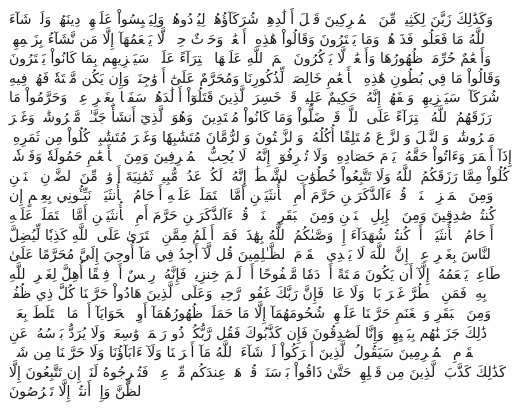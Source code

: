 وَكَذَٰلِكَ زَيَّنَ لِكَثِيرٖ مِّنَ ٱلۡمُشۡرِكِينَ قَتۡلَ أَوۡلَٰدِهِمۡ شُرَكَآؤُهُمۡ لِيُرۡدُوهُمۡ وَلِيَلۡبِسُواْ عَلَيۡهِمۡ دِينَهُمۡۖ وَلَوۡ شَآءَ ٱللَّهُ مَا فَعَلُوهُۖ فَذَرۡهُمۡ وَمَا يَفۡتَرُونَ
وَقَالُواْ هَٰذِهِۦٓ أَنۡعَٰمٞ وَحَرۡثٌ حِجۡرٞ لَّا يَطۡعَمُهَآ إِلَّا مَن نَّشَآءُ بِزَعۡمِهِمۡ وَأَنۡعَٰمٌ حُرِّمَتۡ ظُهُورُهَا وَأَنۡعَٰمٞ لَّا يَذۡكُرُونَ ٱسۡمَ ٱللَّهِ عَلَيۡهَا ٱفۡتِرَآءً عَلَيۡهِۚ سَيَجۡزِيهِم بِمَا كَانُواْ يَفۡتَرُونَ
وَقَالُواْ مَا فِي بُطُونِ هَٰذِهِ ٱلۡأَنۡعَٰمِ خَالِصَةٞ لِّذُكُورِنَا وَمُحَرَّمٌ عَلَىٰٓ أَزۡوَٰجِنَاۖ وَإِن يَكُن مَّيۡتَةٗ فَهُمۡ فِيهِ شُرَكَآءُۚ سَيَجۡزِيهِمۡ وَصۡفَهُمۡۚ إِنَّهُۥ حَكِيمٌ عَلِيمٞ
قَدۡ خَسِرَ ٱلَّذِينَ قَتَلُوٓاْ أَوۡلَٰدَهُمۡ سَفَهَۢا بِغَيۡرِ عِلۡمٖ وَحَرَّمُواْ مَا رَزَقَهُمُ ٱللَّهُ ٱفۡتِرَآءً عَلَى ٱللَّهِۚ قَدۡ ضَلُّواْ وَمَا كَانُواْ مُهۡتَدِينَ
۞وَهُوَ ٱلَّذِيٓ أَنشَأَ جَنَّـٰتٖ مَّعۡرُوشَٰتٖ وَغَيۡرَ مَعۡرُوشَٰتٖ وَٱلنَّخۡلَ وَٱلزَّرۡعَ مُخۡتَلِفًا أُكُلُهُۥ وَٱلزَّيۡتُونَ وَٱلرُّمَّانَ مُتَشَٰبِهٗا وَغَيۡرَ مُتَشَٰبِهٖۚ كُلُواْ مِن ثَمَرِهِۦٓ إِذَآ أَثۡمَرَ وَءَاتُواْ حَقَّهُۥ يَوۡمَ حَصَادِهِۦۖ وَلَا تُسۡرِفُوٓاْۚ إِنَّهُۥ لَا يُحِبُّ ٱلۡمُسۡرِفِينَ
وَمِنَ ٱلۡأَنۡعَٰمِ حَمُولَةٗ وَفَرۡشٗاۚ كُلُواْ مِمَّا رَزَقَكُمُ ٱللَّهُ وَلَا تَتَّبِعُواْ خُطُوَٰتِ ٱلشَّيۡطَٰنِۚ إِنَّهُۥ لَكُمۡ عَدُوّٞ مُّبِينٞ
ثَمَٰنِيَةَ أَزۡوَٰجٖۖ مِّنَ ٱلضَّأۡنِ ٱثۡنَيۡنِ وَمِنَ ٱلۡمَعۡزِ ٱثۡنَيۡنِۗ قُلۡ ءَآلذَّكَرَيۡنِ حَرَّمَ أَمِ ٱلۡأُنثَيَيۡنِ أَمَّا ٱشۡتَمَلَتۡ عَلَيۡهِ أَرۡحَامُ ٱلۡأُنثَيَيۡنِۖ نَبِّـُٔونِي بِعِلۡمٍ إِن كُنتُمۡ صَٰدِقِينَ
وَمِنَ ٱلۡإِبِلِ ٱثۡنَيۡنِ وَمِنَ ٱلۡبَقَرِ ٱثۡنَيۡنِۗ قُلۡ ءَآلذَّكَرَيۡنِ حَرَّمَ أَمِ ٱلۡأُنثَيَيۡنِ أَمَّا ٱشۡتَمَلَتۡ عَلَيۡهِ أَرۡحَامُ ٱلۡأُنثَيَيۡنِۖ أَمۡ كُنتُمۡ شُهَدَآءَ إِذۡ وَصَّىٰكُمُ ٱللَّهُ بِهَٰذَاۚ فَمَنۡ أَظۡلَمُ مِمَّنِ ٱفۡتَرَىٰ عَلَى ٱللَّهِ كَذِبٗا لِّيُضِلَّ ٱلنَّاسَ بِغَيۡرِ عِلۡمٍۚ إِنَّ ٱللَّهَ لَا يَهۡدِي ٱلۡقَوۡمَ ٱلظَّـٰلِمِينَ
قُل لَّآ أَجِدُ فِي مَآ أُوحِيَ إِلَيَّ مُحَرَّمًا عَلَىٰ طَاعِمٖ يَطۡعَمُهُۥٓ إِلَّآ أَن يَكُونَ مَيۡتَةً أَوۡ دَمٗا مَّسۡفُوحًا أَوۡ لَحۡمَ خِنزِيرٖ فَإِنَّهُۥ رِجۡسٌ أَوۡ فِسۡقًا أُهِلَّ لِغَيۡرِ ٱللَّهِ بِهِۦۚ فَمَنِ ٱضۡطُرَّ غَيۡرَ بَاغٖ وَلَا عَادٖ فَإِنَّ رَبَّكَ غَفُورٞ رَّحِيمٞ
وَعَلَى ٱلَّذِينَ هَادُواْ حَرَّمۡنَا كُلَّ ذِي ظُفُرٖۖ وَمِنَ ٱلۡبَقَرِ وَٱلۡغَنَمِ حَرَّمۡنَا عَلَيۡهِمۡ شُحُومَهُمَآ إِلَّا مَا حَمَلَتۡ ظُهُورُهُمَآ أَوِ ٱلۡحَوَايَآ أَوۡ مَا ٱخۡتَلَطَ بِعَظۡمٖۚ ذَٰلِكَ جَزَيۡنَٰهُم بِبَغۡيِهِمۡۖ وَإِنَّا لَصَٰدِقُونَ
فَإِن كَذَّبُوكَ فَقُل رَّبُّكُمۡ ذُو رَحۡمَةٖ وَٰسِعَةٖ وَلَا يُرَدُّ بَأۡسُهُۥ عَنِ ٱلۡقَوۡمِ ٱلۡمُجۡرِمِينَ
سَيَقُولُ ٱلَّذِينَ أَشۡرَكُواْ لَوۡ شَآءَ ٱللَّهُ مَآ أَشۡرَكۡنَا وَلَآ ءَابَآؤُنَا وَلَا حَرَّمۡنَا مِن شَيۡءٖۚ كَذَٰلِكَ كَذَّبَ ٱلَّذِينَ مِن قَبۡلِهِمۡ حَتَّىٰ ذَاقُواْ بَأۡسَنَاۗ قُلۡ هَلۡ عِندَكُم مِّنۡ عِلۡمٖ فَتُخۡرِجُوهُ لَنَآۖ إِن تَتَّبِعُونَ إِلَّا ٱلظَّنَّ وَإِنۡ أَنتُمۡ إِلَّا تَخۡرُصُونَ
